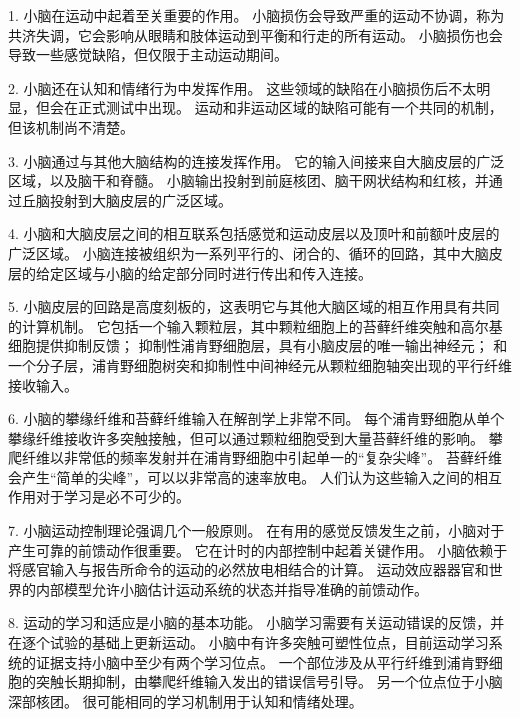 1. 小脑在运动中起着至关重要的作用。
小脑损伤会导致严重的运动不协调，称为共济失调，它会影响从眼睛和肢体运动到平衡和行走的所有运动。
小脑损伤也会导致一些感觉缺陷，但仅限于主动运动期间。


2. 小脑还在认知和情绪行为中发挥作用。
这些领域的缺陷在小脑损伤后不太明显，但会在正式测试中出现。
运动和非运动区域的缺陷可能有一个共同的机制，但该机制尚不清楚。


3. 小脑通过与其他大脑结构的连接发挥作用。
它的输入间接来自大脑皮层的广泛区域，以及脑干和脊髓。
小脑输出投射到前庭核团、脑干网状结构和红核，并通过丘脑投射到大脑皮层的广泛区域。


4. 小脑和大脑皮层之间的相互联系包括感觉和运动皮层以及顶叶和前额叶皮层的广泛区域。
小脑连接被组织为一系列平行的、闭合的、循环的回路，其中大脑皮层的给定区域与小脑的给定部分同时进行传出和传入连接。


5. 小脑皮层的回路是高度刻板的，这表明它与其他大脑区域的相互作用具有共同的计算机制。
它包括一个输入颗粒层，其中颗粒细胞上的苔藓纤维突触和高尔基细胞提供抑制反馈；
抑制性浦肯野细胞层，具有小脑皮层的唯一输出神经元；
和一个分子层，浦肯野细胞树突和抑制性中间神经元从颗粒细胞轴突出现的平行纤维接收输入。


6. 小脑的攀缘纤维和苔藓纤维输入在解剖学上非常不同。
每个浦肯野细胞从单个攀缘纤维接收许多突触接触，但可以通过颗粒细胞受到大量苔藓纤维的影响。
攀爬纤维以非常低的频率发射并在浦肯野细胞中引起单一的“复杂尖峰”。
苔藓纤维会产生“简单的尖峰”，可以以非常高的速率放电。
人们认为这些输入之间的相互作用对于学习是必不可少的。


7. 小脑运动控制理论强调几个一般原则。
在有用的感觉反馈发生之前，小脑对于产生可靠的前馈动作很重要。
它在计时的内部控制中起着关键作用。
小脑依赖于将感官输入与报告所命令的运动的必然放电相结合的计算。
运动效应器器官和世界的内部模型允许小脑估计运动系统的状态并指导准确的前馈动作。


8. 运动的学习和适应是小脑的基本功能。
小脑学习需要有关运动错误的反馈，并在逐个试验的基础上更新运动。
小脑中有许多突触可塑性位点，目前运动学习系统的证据支持小脑中至少有两个学习位点。
一个部位涉及从平行纤维到浦肯野细胞的突触长期抑制，由攀爬纤维输入发出的错误信号引导。
另一个位点位于小脑深部核团。
很可能相同的学习机制用于认知和情绪处理。



